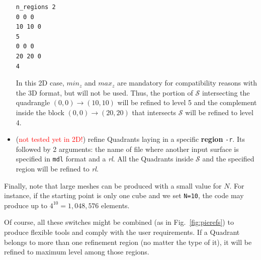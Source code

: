 \documentclass[10pt]{article}
\begin{document}
\begin{itemize}
%
\begin{minipage}{0.2\textwidth}
\begin{verbatim}
n_regions 2
0 0 0
10 10 0
5
0 0 0
20 20 0
4
\end{verbatim}
\end{minipage}
\hfill
\begin{minipage}[c]{0.65\textwidth}
In this 2D case, $min_z$ and $max_z$ are mandatory for compatibility reasons with the 3D format, but will not be used. Thus, the portion of $\mathcal{S}$ intersecting the quadrangle $(0,0) \to (10,10)$ will be refined to level 5 and the complement inside the block $(0,0) \to (20,20)$ that intersects $\mathcal{S}$ will be refined to level 4.\\[0.2cm]
\end{minipage}
\item (\textcolor{red}{not tested yet in 2D!}) refine Quadrants laying in a specific \textbf{region} \texttt{-r}. Its followed by 2 arguments: the name of file where another input surface is specified in \texttt{mdl} format and a \textit{rl}. All the Quadrants inside $\mathcal{S}$ and the specified region will be refined to \textit{rl}. %
\end{itemize}

Finally, note that large meshes can be produced with a small value for $N$. For instance, if the starting point is only one cube and we set \texttt{N=10}, the code may produce up to $4^{10} = 1,048,576$ elements.

Of course, all these switches might be combined (as in Fig.~\ref{fig:pierefs}) to produce flexible tools and comply with the user requirements. If a Quadrant belongs to more than one refinement region (no matter the type of it), it will be refined to maximum level among those regions.\\
\end{document}
